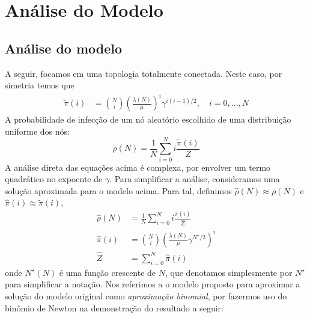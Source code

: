 
\chapter{Análise do Modelo}
\label{cap:analise}
    \section{Análise do modelo} 
    \label{sec:model_analysis}
	    A seguir, focamos em uma topologia totalmente conectada. Neste caso, por simetria temos que
        \begin{align}
            \tilde{\pi}(i) &= \binom{N}{i}  \left( \frac{\lambda(N)}{\mu} \right)^{i} \gamma^{i(i-1)/2}, \quad i=0, \ldots, N
        \end{align}
    	A probabilidade de infecção de um nó aleatório escolhido de uma distribuição uniforme dos nós:
    	\begin{equation}
    		{\rho}(N) = \frac{1}{N}    \sum\limits_{i=0}^{N} i \frac{\tilde{\pi}(i)}{{Z}}  
    		\label{eq:rho_N}
    	\end{equation}
	    A análise direta das equações acima é complexa, por envolver um termo quadrático no expoente de $\gamma$.  Para simplificar a análise,  consideramos  uma solução aproximada para o modelo acima. Para tal, definimos $\hat\rho(N) \approx \rho(N)$ e $\hat\pi(i) \approx \tilde\pi(i)$, 
	    \begin{align}
            \hat{\rho}(N) &= \frac{1}{N} \sum\limits_{i=0}^{N} i \frac{\hat{\pi}(i)}{{\hat Z}}\label{eq:rho_Nhat2} \\
            \hat{\pi}(i)  &= \binom{N}{i} \left(\frac{\lambda(N)}{\mu}\gamma^{N^{\star}/2}\right)^{i} \label{eq:tilde_pi_i} \\
            \hat{Z} &= \sum\limits_{i=0}^{N} \hat{\pi}(i) \label{eq:tilde_hat_z}
        \end{align}
		onde $N^{\star}(N)$ é uma função crescente de $N$, que denotamos simplesmente por $N^{\star}$ para simplificar a notação.  Nos referimos a o modelo proposto para aproximar a solução do modelo original como \textit{aproximação binomial}, por fazermos uso do binômio de Newton na demonstração do resultado a seguir: 

